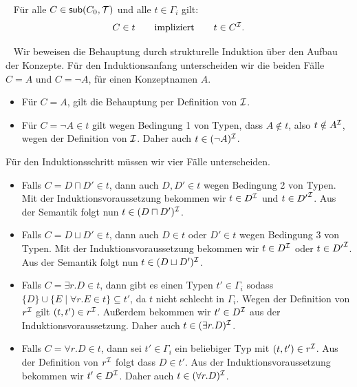 \documentclass[fontsize=11pt, twoside=false, numbers=autoenddot]{scrbook}
\begin{document}
~ Für alle $C\in \textsf{sub}(C_0,\mathcal{T})$
und alle $t\in \Gamma_i$ gilt: 
%
\[C\in t\quad\quad\text{impliziert}\quad\quad t\in C^\mathcal{I}.\]

~
Wir beweisen die Behauptung durch strukturelle Induktion über den
Aufbau der Konzepte. Für den Induktionsanfang unterscheiden wir die
beiden Fälle $C=A$ und $C=\neg A$, für einen Konzeptnamen $A$.
%
\begin{itemize}

  \item Für $C=A$, gilt die Behauptung per Definition von $\mathcal{I}$.

  \item Für $C=\neg A\in t$ gilt wegen Bedingung 1 von Typen, dass
    $A\notin t$, also $t\notin A^\mathcal{I}$, wegen der Definition von
    $\mathcal{I}$. Daher auch $t\in (\neg A)^\mathcal{I}$.

\end{itemize}

Für den Induktionsschritt müssen wir vier Fälle unterscheiden.
%
\begin{itemize}

  \item Falls $C=D\sqcap D'\in t$, dann auch $D,D'\in t$ wegen
    Bedingung 2 von Typen. Mit der Induktionsvoraussetzung bekommen
    wir $t\in D^\mathcal{I}$ und $t\in{D'}^\mathcal{I}$. Aus der Semantik folgt nun
    $t\in (D\sqcap D')^\mathcal{I}$.

  \item Falls $C=D\sqcup D'\in t$, dann auch $D\in t$ oder $D'\in t$ wegen
    Bedingung 3 von Typen. Mit der Induktionsvoraussetzung bekommen
    wir $t\in D^\mathcal{I}$ oder $t\in {D'}^\mathcal{I}$. Aus der Semantik folgt nun
    $t\in (D\sqcup D')^\mathcal{I}$.

  \item Falls $C=\exists r.D\in t$, dann gibt es einen Typen
    $t'\in\Gamma_i$ sodass $\{D\}\cup\{E\mid \forall r.E\in
    t\}\subseteq t'$, da $t$ nicht schlecht in $\Gamma_i$.
    Wegen der Definition von $r^\mathcal{I}$ gilt $(t,t')\in r^\mathcal{I}$.
    Außerdem bekommen wir $t'\in D^\mathcal{I}$ aus der
    Induktionsvoraussetzung. Daher auch $t\in (\exists r.D)^\mathcal{I}$.

  \item Falls $C=\forall r.D\in t$, dann sei $t'\in \Gamma_i$ ein
    beliebiger Typ mit $(t,t')\in r^\mathcal{I}$. Aus der Definition von
    $r^\mathcal{I}$ folgt dass $D\in t'$. Aus der Induktionsvoraussetzung
    bekommen wir $t'\in D^\mathcal{I}$. Daher auch $t\in (\forall r.D)^\mathcal{I}$.

\end{itemize}
\end{document}
